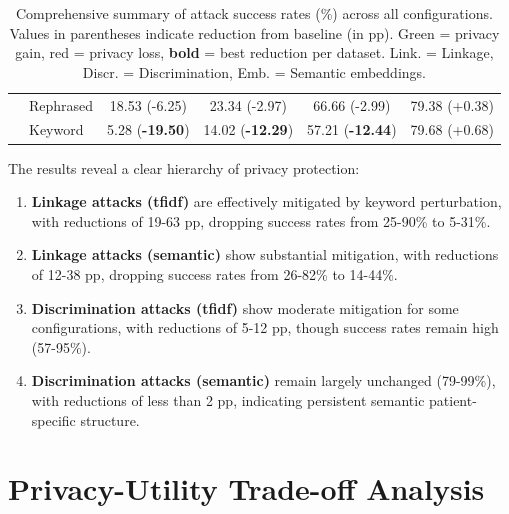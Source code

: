 \begin{table}[h]
\begin{tabular}{llcccc}
 & Rephrased & 18.53 {\scriptsize(\textcolor{green!50!black}{-6.25})} & 23.34 {\scriptsize(\textcolor{green!50!black}{-2.97})} & 66.66 {\scriptsize(\textcolor{green!50!black}{-2.99})} & 79.38 {\scriptsize(\textcolor{red!70!black}{+0.38})} \\
 & Keyword & 5.28 {\scriptsize(\textbf{\textcolor{green!50!black}{-19.50}})} & 14.02 {\scriptsize(\textbf{\textcolor{green!50!black}{-12.29}})} & 57.21 {\scriptsize(\textbf{\textcolor{green!50!black}{-12.44}})} & 79.68 {\scriptsize(\textcolor{red!70!black}{+0.68})} \\
\bottomrule
\end{tabular}
\caption{Comprehensive summary of attack success rates (\%) across all configurations. Values in parentheses indicate reduction from baseline (in pp). \textcolor{green!50!black}{Green} = privacy gain, \textcolor{red!70!black}{red} = privacy loss, \textbf{bold} = best reduction per dataset. Link. = Linkage, Discr. = Discrimination, Emb. = Semantic embeddings.}
\label{tab:comprehensive_summary}
\end{table}

The results reveal a clear hierarchy of privacy protection:

\begin{enumerate}
    \item \textbf{Linkage attacks (\gls{tfidf})} are effectively mitigated by keyword perturbation, with reductions of 19-63 pp, dropping success rates from 25-90\% to 5-31\%.
    
    \item \textbf{Linkage attacks (semantic)} show substantial mitigation, with reductions of 12-38 pp, dropping success rates from 26-82\% to 14-44\%.
    
    \item \textbf{Discrimination attacks (\gls{tfidf})} show moderate mitigation for some configurations, with reductions of 5-12 pp, though success rates remain high (57-95\%).
    
    \item \textbf{Discrimination attacks (semantic)} remain largely unchanged (79-99\%), with reductions of less than 2 pp, indicating persistent semantic patient-specific structure.
\end{enumerate}

\section{Privacy-Utility Trade-off Analysis}
\label{sec:privacy_utility}

